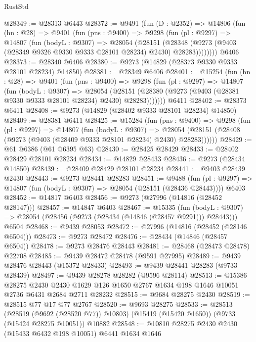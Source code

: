 \begin{lexlean}{RustStd}
\begin{coremodule}
@28349 := @28313 @6443
@28372 := @9491
    (fun (D : @2352) =>
    @14806
      (fun (hn : @28) =>
      @9401
        (fun (pns : @9400) =>
        @9298
          (fun (pl : @9297) =>
          @14807
            (fun (bodyL : @9307) =>
            @28054
              (@28151
                (@28348 (@9273 (@9403 (@28349 @9326 @9330 @9333 @28101 @28234) @2430) @28283))))))))
    @6406
@28373 := @28340 @6406
@28380 := @9273 (@14829 (@28373 @9330 @9333 @28101 @28234) @14850)
@28381 := @28349 @6406
@28401 := @15254
    (fun (hn : @28) =>
    @9401
      (fun (pns : @9400) =>
      @9298
        (fun (pl : @9297) =>
        @14807
          (fun (bodyL : @9307) =>
          @28054
            (@28151 (@28380 (@9273 (@9403 (@28381 @9330 @9333 @28101 @28234) @2430) @28283)))))))
    @6411
@28402 := @28373 @6411
@28408 := @9273 (@14829 (@28402 @9333 @28101 @28234) @14850)
@28409 := @28381 @6411
@28425 := @15284
    (fun (pns : @9400) =>
    @9298
      (fun (pl : @9297) =>
      @14807
        (fun (bodyL : @9307) =>
        @28054 (@28151 (@28408 (@9273 (@9403 (@28409 @9333 @28101 @28234) @2430) @28283))))))
@28429 := @61 @6386 (@61 @6395 @63)
@28430 := @28425 @28429
@28433 := @28402 @28429 @28101 @28234
@28434 := @14829 @28433
@28436 := @9273 (@28434 @14850)
@28439 := @28409 @28429 @28101 @28234
@28441 := @9403 @28439 @2430
@28443 := @9273 @28441 @28283
@28451 := @9488
    (fun (pl : @9297) => @14807 (fun (bodyL : @9307) => @28054 (@28151 (@28436 @28443))))
    @6403
@28452 := @14817 @6403
@28456 := @9273 (@27996 (@14816 (@28452 @28147)))
@28457 := @14847 @6403
@28467 := @15335
    (fun (bodyL : @9307) => @28054 (@28456 (@9273 (@28434 (@14846 (@28457 @9291))) @28443)))
    @6504
@28468 := @9439 @28053
@28472 := @27996 (@14816 (@28452 (@28146 @6504)))
@28473 := @9273 @28472
@28476 := @28434 (@14846 (@28457 @6504))
@28478 := @9273 @28476 @28443
@28481 := @28468 (@28473 @28478) @22708
@28485 := @9439 @28472 @28478 (@9591 @27995)
@28489 := @9439 @28476 @28443 (@15372 @28433)
@28493 := @9439 @28441 @28283 (@9733 @28439)
@28497 := @9439 @28278 @28282 (@9596 @28114)
@28513 := @15386
    @28275
    @2430
    @2430
    @1629
    @126
    @1650
    @2767
    @1634
    @198
    @1646
    @10051
    @2736
    @6431
    @2684
    @2711
    @28232
@28515 := @9684 @28275 @2430
@28519 := @28515 @77 @17 @77 @2767
@28520 := @9693 @28275
@28533 := @28513
    (@28519 (@9692 (@28520 @77)) @10803)
    (@15419 (@15420 @1650))
    (@9733 (@15424 @28275 @10051))
    @10882
@28548 := @10810
    @28275
    @2430
    @2430
    (@15433 @6432 @198 @10051)
    @6441
    @1634
    @1646

\end{coremodule}
\end{lexlean}
